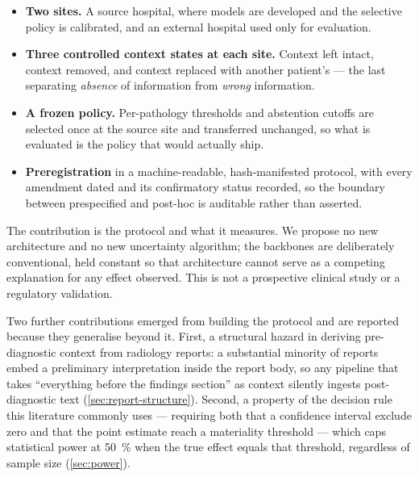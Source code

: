 \begin{itemize}
  \item \textbf{Two sites.} A source hospital, where models are developed and
    the selective policy is calibrated, and an external hospital used only for
    evaluation.
  \item \textbf{Three controlled context states at each site.} Context left
    intact, context removed, and context replaced with another patient's ---
    the last separating \emph{absence} of information from \emph{wrong}
    information.
  \item \textbf{A frozen policy.} Per-pathology thresholds and abstention
    cutoffs are selected once at the source site and transferred unchanged, so
    what is evaluated is the policy that would actually ship.
  \item \textbf{Preregistration} in a machine-readable, hash-manifested
    protocol, with every amendment dated and its confirmatory status recorded,
    so the boundary between prespecified and post-hoc is auditable rather than
    asserted.
\end{itemize}

The contribution is the protocol and what it measures. We propose no new
architecture and no new uncertainty algorithm; the backbones are deliberately
conventional, held constant so that architecture cannot serve as a competing
explanation for any effect observed. This is not a prospective clinical study or
a regulatory validation.

Two further contributions emerged from building the protocol and are reported
because they generalise beyond it. First, a structural hazard in deriving
pre-diagnostic context from radiology reports: a substantial minority of reports
embed a preliminary interpretation inside the report body, so any pipeline that
takes ``everything before the findings section'' as context silently ingests
post-diagnostic text (\cref{sec:report-structure}). Second, a property of the
decision rule this literature commonly uses --- requiring both that a confidence
interval exclude zero and that the point estimate reach a materiality threshold
--- which caps statistical power at \SI{50}{\percent} when the true effect
equals that threshold, regardless of sample size (\cref{sec:power}).
